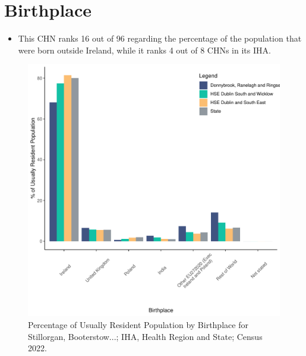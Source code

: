 \documentclass{article}
\begin{document}
\section{Birthplace}\label{sect:Birth}
\begin{itemize}
\item This CHN ranks  16 out of 96 regarding the percentage of the population that were born outside Ireland, while it ranks  4 out of 8 CHNs in its IHA.
\end{itemize}
\begin{figure}[H]
	\centering
	\includegraphics[width = 130mm]{../figures/BirthED.pdf}
	\caption{Percentage of Usually Resident Population by Birthplace for Stillorgan, Booterstow...; IHA, Health Region and State; Census 2022.}
	\label{fig:vbnv}
	\end{figure}
	
\end{document}
